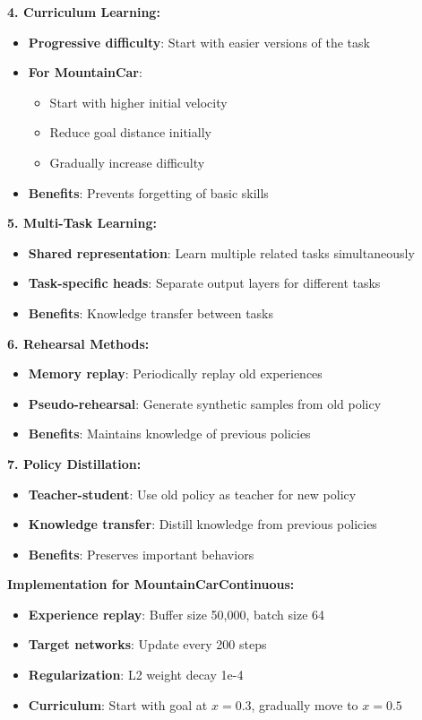 \documentclass[12pt]{article}
\begin{document}
{{{\textbf{4. Curriculum Learning:}
\begin{itemize}
    \item \textbf{Progressive difficulty}: Start with easier versions of the task
    \item \textbf{For MountainCar}: 
    \begin{itemize}
        \item Start with higher initial velocity
        \item Reduce goal distance initially
        \item Gradually increase difficulty
    \end{itemize}
    \item \textbf{Benefits}: Prevents forgetting of basic skills
\end{itemize}

\textbf{5. Multi-Task Learning:}
\begin{itemize}
    \item \textbf{Shared representation}: Learn multiple related tasks simultaneously
    \item \textbf{Task-specific heads}: Separate output layers for different tasks
    \item \textbf{Benefits}: Knowledge transfer between tasks
\end{itemize}

\textbf{6. Rehearsal Methods:}
\begin{itemize}
    \item \textbf{Memory replay}: Periodically replay old experiences
    \item \textbf{Pseudo-rehearsal}: Generate synthetic samples from old policy
    \item \textbf{Benefits}: Maintains knowledge of previous policies
\end{itemize}

\textbf{7. Policy Distillation:}
\begin{itemize}
    \item \textbf{Teacher-student}: Use old policy as teacher for new policy
    \item \textbf{Knowledge transfer}: Distill knowledge from previous policies
    \item \textbf{Benefits}: Preserves important behaviors
\end{itemize}

\textbf{Implementation for MountainCarContinuous:}
\begin{itemize}
    \item \textbf{Experience replay}: Buffer size 50,000, batch size 64
    \item \textbf{Target networks}: Update every 200 steps
    \item \textbf{Regularization}: L2 weight decay 1e-4
    \item \textbf{Curriculum}: Start with goal at $x = 0.3$, gradually move to $x = 0.5$
\end{itemize}

}}}
\end{document}
